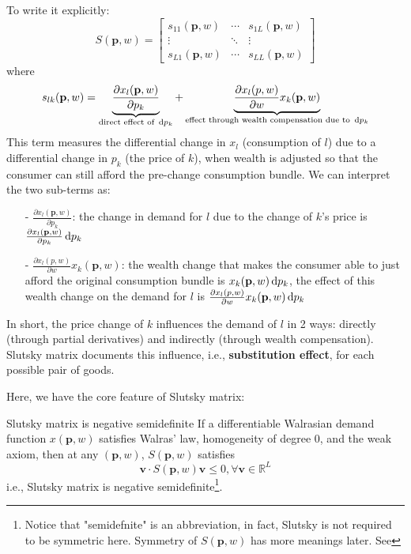 To write it explicitly:
$$
S(\mathbf{p},w)=
\begin{bmatrix}
    s_{11}(\mathbf{p},w) & \cdots & s_{1L}(\mathbf{p},w)\\
    \vdots & \ddots & \vdots \\
    s_{L1}(\mathbf{p},w) & \cdots & s_{LL}(\mathbf{p},w)
\end{bmatrix}
$$
where $$s_{lk}(\mathbf{p},w)=\underbrace{\frac{\partial x_l(\mathbf{p},w)}{\partial p_k}}_{\text{direct effect of }\mathop{}\!\mathrm{d} p_k} +\underbrace{\frac{\partial x_l (p,w)}{\partial w}x_k(\mathbf{p},w)}_{\text{effect through wealth compensation due to }\mathop{}\!\mathrm{d} p_k}$$
This term measures the differential change in $x_l$ (consumption of $l$) due to a differential change in $p_k$ (the price of $k$), when wealth is adjusted so that the consumer can still afford the pre-change consumption bundle. We can interpret the two sub-terms as:
\begin{enumerate}
    \item[-] $\frac{\partial x_l(\mathbf{p},w)}{\partial p_k}$: the change in demand for $l$ due to the change of $k$'s price is $\frac{\partial x_l(\mathbf{p},w)}{\partial p_k}\mathop{}\!\mathrm{d} p_k$
    \item[-] $\frac{\partial x_l (p,w)}{\partial w}x_k(\mathbf{p},w)$: the wealth change that makes the consumer able to just afford the original consumption bundle is $x_k(\mathbf{p},w)\mathop{}\!\mathrm{d} p_k$, the effect of this wealth change on the demand for $l$ is $\frac{\partial x_l (p,w)}{\partial w}x_k(\mathbf{p},w)\mathop{}\!\mathrm{d} p_k$
\end{enumerate}
In short, the price change of $k$ influences the demand of $l$ in 2 ways: directly (through partial derivatives) and indirectly (through wealth compensation). Slutsky matrix documents this influence, i.e., \textbf{substitution effect}, for each possible pair of goods. 

Here, we have the core feature of Slutsky matrix: 
\begin{theorem}{Slutsky matrix is negative semidefinite}{}
    If a differentiable Walrasian demand function $ x(\mathbf{p},w)$ satisfies Walras' law, homogeneity of degree 0, and the weak axiom, then at any $(\mathbf{p},w)$, $S(\mathbf{p},w)$ satisfies
    $$\mathbf{v}\cdot S(\mathbf{p},w)\mathbf{v}\leq 0, \forall \mathbf{v}\in\mathbb{R}^L$$
    i.e., Slutsky matrix is negative semidefinite\footnote{Notice that "semidefnite" is an abbreviation, in fact, Slutsky is not required to be symmetric here. Symmetry of $S(\mathbf{p},w)$ has more meanings later. See }.
\end{theorem}

